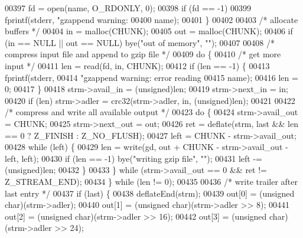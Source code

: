 \begin{DoxyCode}
{00397         fd = open(name, O\_RDONLY, 0);
00398         \textcolor{keywordflow}{if} (fd == -1)
00399             fprintf(stderr, \textcolor{stringliteral}{"gzappend warning: %
00400                     name);
00401     \}
00402 
00403     \textcolor{comment}{/* allocate buffers */}
00404     in = malloc(CHUNK);
00405     out = malloc(CHUNK);
00406     \textcolor{keywordflow}{if} (in == NULL || out == NULL) bye(\textcolor{stringliteral}{"out of memory"}, \textcolor{stringliteral}{""});
00407 
00408     \textcolor{comment}{/* compress input file and append to gzip file */}
00409     \textcolor{keywordflow}{do} \{
00410         \textcolor{comment}{/* get more input */}
00411         len = read(fd, in, CHUNK);
00412         \textcolor{keywordflow}{if} (len == -1) \{
00413             fprintf(stderr,
00414                     \textcolor{stringliteral}{"gzappend warning: error reading %
00415                     name);
00416             len = 0;
00417         \}
00418         strm->avail\_in = (unsigned)len;
00419         strm->next\_in = in;
00420         \textcolor{keywordflow}{if} (len) strm->adler = crc32(strm->adler, in, (\textcolor{keywordtype}{unsigned})len);
00421 
00422         \textcolor{comment}{/* compress and write all available output */}
00423         \textcolor{keywordflow}{do} \{
00424             strm->avail\_out = CHUNK;
00425             strm->next\_out = out;
00426             ret = deflate(strm, last && len == 0 ? Z\_FINISH : Z\_NO\_FLUSH);
00427             left = CHUNK - strm->avail\_out;
00428             \textcolor{keywordflow}{while} (left) \{
00429                 len = write(gd, out + CHUNK - strm->avail\_out - left, left);
00430                 \textcolor{keywordflow}{if} (len == -1) bye(\textcolor{stringliteral}{"writing gzip file"}, \textcolor{stringliteral}{""});
00431                 left -= (unsigned)len;
00432             \}
00433         \} \textcolor{keywordflow}{while} (strm->avail\_out == 0 && ret != Z\_STREAM\_END);
00434     \} \textcolor{keywordflow}{while} (len != 0);
00435 
00436     \textcolor{comment}{/* write trailer after last entry */}
00437     \textcolor{keywordflow}{if} (last) \{
00438         deflateEnd(strm);
00439         out[0] = (\textcolor{keywordtype}{unsigned} char)(strm->adler);
00440         out[1] = (\textcolor{keywordtype}{unsigned} char)(strm->adler >> 8);
00441         out[2] = (\textcolor{keywordtype}{unsigned} char)(strm->adler >> 16);
00442         out[3] = (\textcolor{keywordtype}{unsigned} char)(strm->adler >> 24);
}}}
\end{DoxyCode}
